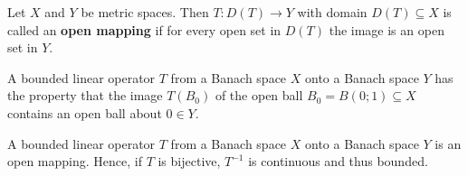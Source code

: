 \begin{definition}
   Let \( X  \) and \( Y  \) be metric spaces. Then \( T: D(T) \to Y \) with domain \( D(T) \subseteq  X  \) is called an \textbf{open mapping} if for every open set in \( D(T) \) the image is an open set in \( Y  \). 
\end{definition}

\begin{lemma}
   A bounded linear operator \( T \) from a Banach space \( X  \) onto a Banach space \(  Y  \) has the property that the image \( T({B}_{0}) \) of the open ball \( {B}_{0} = B(0;1) \subseteq  X   \) contains an open ball about \( 0 \in Y \).
\end{lemma}

\begin{theorem}
   A bounded linear operator \( T  \) from a Banach space \( X  \) onto a Banach space \( Y  \) is an open mapping. Hence, if \( T  \) is bijective, \( T^{-1} \) is continuous and thus bounded.
\end{theorem}
